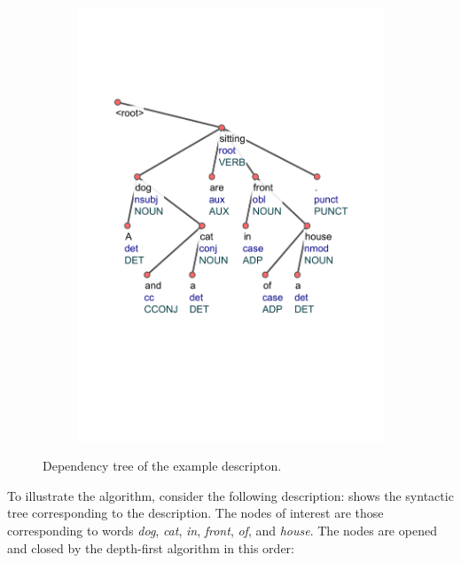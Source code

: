 \begin{figure}[ht]
    \centering
    \begin{subfigure}{0.5\textwidth}
        \centering
        \includegraphics[width=\textwidth,trim=40 160 40 120,clip]{figures/dog_and_cat_in_front_of_house.pdf}
    \end{subfigure}
    \caption[Dependency tree of the example descripton]{Dependency tree of the example descripton.\protect{}}
    \label{fig:dependency_trees:2}
\end{figure}
\addtocounter{footnote}{1}

\medskip

To illustrate the algorithm, consider the following description:    shows the syntactic tree corresponding to the description. The nodes of interest are those corresponding to words \emph{dog}, \emph{cat}, \emph{in}, \emph{front}, \emph{of}, and \emph{house}. The nodes are opened and closed by the depth-first algorithm in this order:


